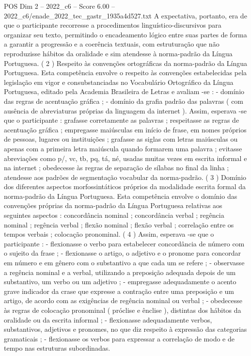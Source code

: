 \begin{textsample}{POS Dim 2 – 2022\_c6 – Score 6.00 – 2022\_c6/enade\_2022\_tec\_gastr\_1935a4d527.txt}
A expectativa, portanto, era de que o participante recorresse a procedimentos linguístico-discursivos para organizar seu texto, permitindo o encadeamento lógico entre suas partes de forma a garantir a progressão e a coerência textuais, com estruturação que não reproduzisse hábitos da oralidade e sim atendesse à norma-padrão da Língua Portuguesa. ( 2 ) Respeito às convenções ortográficas da norma-padrão da Língua Portuguesa.
Esta competência envolve o respeito às convenções estabelecidas pela legislação em vigor e consubstanciadas no Vocabulário Ortográfico da Língua Portuguesa, editado pela Academia Brasileira de Letras e avaliam -se : - domínio das regras de acentuação gráfica ; - domínio da grafia padrão das palavras ( com ausência de abreviaturas próprias da linguagem da internet ).
Assim, esperava -se que o participante : grafasse corretamente as palavras ; respeitasse as regras de acentuação gráfica ; empregasse maiúsculas em início de frase, em nomes próprios de pessoas, lugares ou instituições ; grafasse as siglas com letras maiúsculas ou apenas com a primeira letra maiúscula quando formarem uma palavra ; evitasse abreviações como p/, vc, tb, pq, tá, né, usadas muitas vezes em escrita informal e na internet ; obedecesse às regras de separação de sílabas no final da linha ; atendesse aos padrões de segmentação vocabular da norma-padrão. ( 3 ) Domínio dos diferentes aspectos morfossintáticos próprios da modalidade escrita formal da norma-padrão da Língua Portuguesa.
Esta competência envolve o domínio das convenções próprias da norma-padrão da Língua Portuguesa relativas aos seguintes aspectos : concordância nominal ; concordância verbal ; regência nominal ; regência verbal ; flexão nominal ; flexão verbal ; correlação entre os tempos verbais ; colocação pronominal. ( 4 ) Assim, esperava -se que o participante : - flexionasse o verbo para estabelecer concordância de número com o sujeito da frase ; - flexionasse o artigo, o adjetivo e o pronome para concordar em número e em gênero com o substantivo a que cada um se refere ; - observasse a regência nominal e a verbal, utilizando a preposição adequada depois de um substantivo, um verbo ou um adjetivo ; - empregasse adequadamente o acento grave indicador da crase que expresse a contração entre uma preposição e um artigo, de acordo com as exigências de regência nominal ou verbal ; - obedecesse às regras de colocação pronominal ( próclise e ênclise ), distintas dos hábitos da oralidade ou da escrita informal ; - flexionasse adequadamente verbos, substantivos, adjetivos e pronomes, no que diz respeito à expressão das categorias gramaticais ; - flexionasse os verbos para expressar a correlação de modo e de tempo nas estruturas subordinadas.

\end{textsample}
